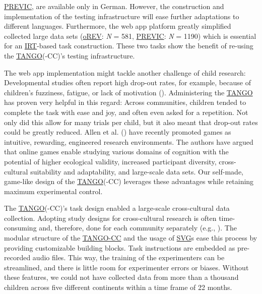 \documentclass[
]{scrbook}
\begin{document}
\hyperref[acronyms_PREVIC]{PREVIC}, are available only in German. However, the construction and implementation of the testing infrastructure will ease further adaptations to different languages. Furthermore, the web app platform greatly simplified collected large data sets (\hyperref[acronyms_oREV]{oREV}: \emph{N} = 581, \hyperref[acronyms_PREVIC]{PREVIC}: \emph{N} = 1190) which is essential for an \hyperref[acronyms_IRT]{IRT}-based task construction. These two tasks show the benefit of re-using the \hyperref[acronyms_TANGO]{TANGO}(-CC)'s testing infrastructure.

The web app implementation might tackle another challenge of child research: Developmental studies often report high drop-out rates, for example, because of children's fuzziness, fatigue, or lack of motivation (). Administering the \hyperref[acronyms_TANGO]{TANGO} has proven very helpful in this regard: Across communities, children tended to complete the task with ease and joy, and often even asked for a repetition. Not only did this allow for many trials per child, but it also meant that drop-out rates could be greatly reduced. Allen et al. () have recently promoted games as intuitive, rewarding, engineered research environments. The authors have argued that online games enable studying various domains of cognition with the potential of higher ecological validity, increased participant diversity, cross-cultural suitability and adaptability, and large-scale data sets. Our self-made, game-like design of the \hyperref[acronyms_TANGO]{TANGO}(-CC) leverages these advantages while retaining maximum experimental control.

The \hyperref[acronyms_TANGO]{TANGO}(-CC)'s task design enabled a large-scale cross-cultural data collection. Adopting study designs for cross-cultural research is often time-consuming and, therefore, done for each community separately (e.g., ). The modular structure of the \hyperref[acronyms_TANGO-CC]{TANGO-CC} and the usage of \hyperref[acronyms_SVG]{SVG}s ease this process by providing customizable building blocks. Task instructions are embedded as pre-recorded audio files. This way, the training of the experimenters can be streamlined, and there is little room for experimenter errors or biases. Without these features, we could not have collected data from more than a thousand children across five different continents within a time frame of 22 months.
\end{document}
